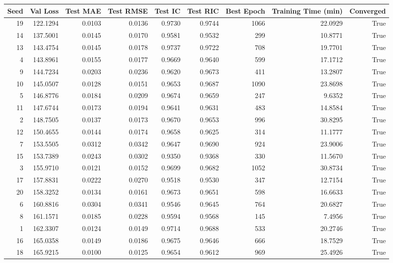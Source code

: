 \begin{tabular}{rrrrrrrrr}
\toprule
Seed & Val Loss & Test MAE & Test RMSE & Test IC & Test RIC & Best Epoch & Training Time (min) & Converged \\
\midrule
19 & 122.1294 & 0.0103 & 0.0136 & 0.9730 & 0.9744 & 1066 & 22.0929 & True \\
14 & 137.5001 & 0.0145 & 0.0170 & 0.9581 & 0.9532 & 299 & 10.8771 & True \\
13 & 143.4754 & 0.0145 & 0.0178 & 0.9737 & 0.9722 & 708 & 19.7701 & True \\
4 & 143.8961 & 0.0155 & 0.0177 & 0.9669 & 0.9640 & 599 & 17.1712 & True \\
9 & 144.7234 & 0.0203 & 0.0236 & 0.9620 & 0.9673 & 411 & 13.2807 & True \\
10 & 145.0507 & 0.0128 & 0.0151 & 0.9653 & 0.9687 & 1090 & 23.8698 & True \\
5 & 146.8776 & 0.0184 & 0.0209 & 0.9674 & 0.9659 & 247 & 9.6352 & True \\
11 & 147.6744 & 0.0173 & 0.0194 & 0.9641 & 0.9631 & 483 & 14.8584 & True \\
2 & 148.7505 & 0.0137 & 0.0173 & 0.9670 & 0.9653 & 996 & 30.8295 & True \\
12 & 150.4655 & 0.0144 & 0.0174 & 0.9658 & 0.9625 & 314 & 11.1777 & True \\
7 & 153.5505 & 0.0312 & 0.0342 & 0.9647 & 0.9690 & 924 & 23.9006 & True \\
15 & 153.7389 & 0.0243 & 0.0302 & 0.9350 & 0.9368 & 330 & 11.5670 & True \\
3 & 155.9710 & 0.0121 & 0.0152 & 0.9699 & 0.9682 & 1052 & 30.8734 & True \\
17 & 157.8831 & 0.0222 & 0.0270 & 0.9518 & 0.9530 & 347 & 12.7154 & True \\
20 & 158.3252 & 0.0134 & 0.0161 & 0.9673 & 0.9651 & 598 & 16.6633 & True \\
6 & 160.8816 & 0.0304 & 0.0341 & 0.9546 & 0.9645 & 764 & 20.6827 & True \\
8 & 161.1571 & 0.0185 & 0.0228 & 0.9594 & 0.9568 & 145 & 7.4956 & True \\
1 & 162.3307 & 0.0124 & 0.0149 & 0.9714 & 0.9688 & 533 & 20.2746 & True \\
16 & 165.0358 & 0.0149 & 0.0186 & 0.9675 & 0.9646 & 666 & 18.7529 & True \\
18 & 165.9215 & 0.0100 & 0.0125 & 0.9654 & 0.9612 & 969 & 25.4926 & True \\
\bottomrule
\end{tabular}

